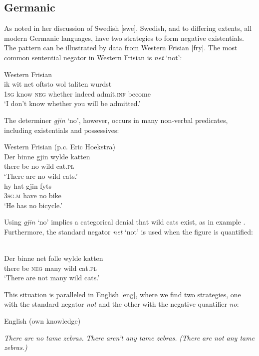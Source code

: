 \documentclass[output=paper]{langsci/langscibook}
\begin{document}
\subsection{Germanic}\label{sec:ieur-4.5}


As \citet[114--115]{Veselinova2013} noted in her discussion of
Swedish [swe], Swedish, and to differing extents, all modern
Germanic languages, have two strategies to form negative
existentials. The pattern can be illustrated by data from Western
Frisian [fry]. The most common sentential negator in Western Frisian is \textit{net} `not':
%
\begin{exe}\ex
Western Frisian \citep[91]{Tiersma1999}\\
    \gll ik    wit     net   oftsto     wol      taliten      wurdst \\
\textsc{1sg} know \textsc{neg} whether indeed admit.\textsc{inf} become\\
    \glt `I don't know whether you will be admitted.' 
    \end{exe}
%
The determiner \textit{gjin} `no', however, occurs in many non-verbal predicates, including existentials and possessives:
%
\begin{exe}\ex\label{ex:ieur-frisian-nowildcatsnow}
Western Frisian (p.c. Eric Hoekstra)\\
    \gll Der   binne gjin wylde katten \\
there be       no   wild   cat.\textsc{pl} \\
    \glt `There are no wild cats.' 
\ex
{}\\
    \gll hy hat   gjin fyts \\
  \textsc{3sg.m} have no   bike \\
    \glt `He has no bicycle.'
    \end{exe} 
%
Using \textit{gjin} `no' implies a categorical denial that wild cats exist, as in example . Furthermore, the standard negator \textit{net} `not' is used when the figure is quantified:
%
\begin{exe}\ex
{}\\
    \gll Der   binne  net   folle  wylde katten \\
there be       \textsc{neg} many wild   cat.\textsc{pl} \\
    \glt `There are not many wild cats.' 
    \end{exe}
%
This situation is paralleled in English [eng], where we find two strategies, one with the standard negator \textit{not} and the other with the negative quantifier \textit{no}:
%
\begin{exe}\ex English (own knowledge)\begin{xlist}
        \ex\label{ex:ieur-english-no-tame-zebras}
     \textit{There are no tame zebras.}
\ex \textit{There aren’t any tame zebras.} \textit{(There are not any tame zebras.)}
    \end{xlist}\end{exe}
\end{document}
